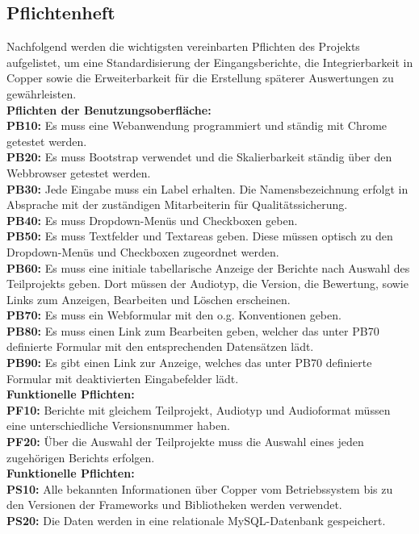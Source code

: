 \subsection{Pflichtenheft}
\label{sec:Pflichtenheft}
Nachfolgend werden die wichtigsten vereinbarten Pflichten des Projekts aufgelistet, um eine Standardisierung der Eingangsberichte, die Integrierbarkeit in Copper sowie die Erweiterbarkeit für die Erstellung späterer Auswertungen zu gewährleisten.\\[1.5ex]
\textbf{Pflichten der Benutzungsoberfläche:}\\[1.5ex]
\textbf{PB10:} Es muss eine Webanwendung programmiert und ständig mit Chrome getestet werden.\\
\textbf{PB20:} Es muss Bootstrap verwendet und die Skalierbarkeit ständig über den Webbrowser getestet werden.\\
\textbf{PB30:} Jede Eingabe muss ein Label erhalten. Die Namensbezeichnung erfolgt in Absprache mit der zuständigen Mitarbeiterin für Qualitätssicherung.\\
\textbf{PB40:} Es muss Dropdown-Menüs und Checkboxen geben.\\
\textbf{PB50:} Es muss Textfelder und Textareas geben. Diese müssen optisch zu den Dropdown-Menüs und Checkboxen zugeordnet werden.\\
\textbf{PB60:} Es muss eine initiale tabellarische Anzeige der Berichte nach Auswahl des Teilprojekts geben. Dort müssen der Audiotyp, die Version, die Bewertung, sowie Links zum Anzeigen, Bearbeiten und Löschen erscheinen.\\
\textbf{PB70:} Es muss ein Webformular mit den o.g. Konventionen geben.\\
\textbf{PB80:} Es muss einen Link zum Bearbeiten geben, welcher das unter PB70 definierte Formular mit den entsprechenden Datensätzen lädt.\\
\textbf{PB90:} Es gibt einen Link zur Anzeige, welches das unter PB70 definierte Formular mit deaktivierten Eingabefelder lädt.\\[1.5ex]
\textbf{Funktionelle Pflichten:}\\[1.5ex]
\textbf{PF10:} Berichte mit gleichem Teilprojekt, Audiotyp und Audioformat müssen eine unterschiedliche Versionsnummer haben.\\
\textbf{PF20:} Über die Auswahl der Teilprojekte muss die Auswahl eines jeden zugehörigen Berichts erfolgen.\\[1.5ex]
\textbf{Funktionelle Pflichten:}\\[1.5ex]
\textbf{PS10:} Alle bekannten Informationen über Copper vom Betriebssystem bis zu den Versionen der Frameworks und Bibliotheken werden verwendet.\\
\textbf{PS20:} Die Daten werden in eine relationale MySQL-Datenbank gespeichert.

